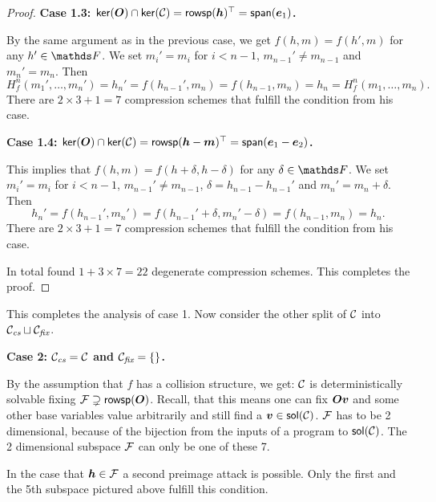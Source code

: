 \begin{proof}
\textbf{Case 1.3: $\mathsf{ker}(\boldsymbol{O}) \cap \mathsf{ker}(\mathcal{C}) = \mathsf{rowsp}(\boldsymbol h)^\top = \mathsf{span}(\boldsymbol e_1)$.}

By the same argument as in the previous case, we get $f(h,m) = f(h',m)$ for any $h' \in \F$.
We set $m_i' = m_i$ for $i<n-1$, $m_{n-1}' \neq m_{n-1}$ and $m_n' = m_n$. 
Then
\[
H^n_f(m_1', \dots, m_n') = h_n' = f(h_{n-1}', m_n) = f(h_{n-1}, m_n) = h_n = H^n_f(m_1, \dots, m_n).
\]
There are $2 \times 3 + 1 = 7$ compression schemes that fulfill the condition from his case.
\begin{center}
\end{center}

\textbf{Case 1.4: $\mathsf{ker}(\boldsymbol{O}) \cap \mathsf{ker}(\mathcal{C}) = \mathsf{rowsp}(\boldsymbol h - \boldsymbol m)^\top = \mathsf{span}(\boldsymbol e_1 - \boldsymbol e_2)$.}

This implies that $f(h,m) = f(h + \delta, h - \delta)$ for any $\delta \in \F$.
We set $m_i' = m_i$ for $i<n-1$, $m_{n-1}' \neq m_{n-1}$, $\delta = h_{n-1} - h_{n-1}'$ and $m_n' = m_n + \delta$.
Then
\[
h_n' = f(h_{n-1}', m_n') = f(h_{n-1}' + \delta, m_n' - \delta) = f(h_{n-1}, m_n) = h_n.
\]
There are $2 \times 3 + 1 = 7$ compression schemes that fulfill the condition from his case.
\begin{center}
\end{center}

In total found $1 + 3\times7 = 22$ degenerate compression schemes.
This completes the proof.
\end{proof}

This completes the analysis of case 1.
Now consider the other split of $\mathcal{C}$ into $\mathcal{C}_\textit{cs} \sqcup \mathcal{C}_\textit{fix}$.

\textbf{Case 2: $\mathcal{C}_\textit{cs} = \mathcal{C}$ and $\mathcal{C}_\textit{fix} = \{\}$.}

By the assumption that $f$ has a collision structure, we get:
$\mathcal{C}$ is deterministically solvable fixing $\mathcal{F} \supsetneq \mathsf{rowsp}(\boldsymbol{O})$.
Recall, that this means one can fix $\boldsymbol{O}\boldsymbol v$ and some other base variables value arbitrarily and still find a $\boldsymbol v \in \mathsf{sol}(\mathcal{C})$.
$\mathcal{F}$ has to be 2 dimensional, because of the bijection from the inputs of a program to $\mathsf{sol}(\mathcal{C})$.
The 2 dimensional subspace $\mathcal{F}$ can only be one of these 7.
\begin{center}
\end{center}
In the case that $\boldsymbol h \in \mathcal{F}$ a second preimage attack is possible.
Only the first and the 5th subspace pictured above fulfill this condition.

